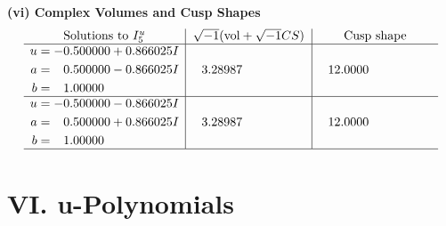 \documentclass[1p]{elsarticle_modified}
\theoremstyle{definition}
\newcommand{\I}{\sqrt{-1}}
\begin{document}
\newpage\flushleft \textbf{(vi) Complex Volumes and Cusp Shapes}
$$\begin{array}{c|c|c}  
\text{Solutions to }I^u_{5}& \I (\text{vol} + \sqrt{-1}CS) & \text{Cusp shape}\\
 \hline 
\begin{aligned}
u &= -0.500000 + 0.866025 I \\
a &= \phantom{-}0.500000 - 0.866025 I \\
b &= \phantom{-}1.00000\phantom{ +0.000000I}\end{aligned}
 & \phantom{-}3.28987\phantom{ +0.000000I} & \phantom{-}12.0000\phantom{ +0.000000I} \\ \hline\begin{aligned}
u &= -0.500000 - 0.866025 I \\
a &= \phantom{-}0.500000 + 0.866025 I \\
b &= \phantom{-}1.00000\phantom{ +0.000000I}\end{aligned}
 & \phantom{-}3.28987\phantom{ +0.000000I} & \phantom{-}12.0000\phantom{ +0.000000I}\\
 \hline 
 \end{array}$$\newpage
\newpage\renewcommand{\arraystretch}{1}
\centering \section*{ VI. u-Polynomials}
\end{document}
